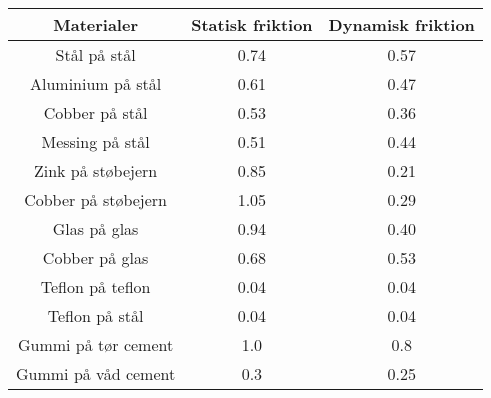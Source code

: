 \begin{tabular}{|c|c|c|}
	\hline
	Materialer&Statisk friktion&Dynamisk friktion\\
	\hline
	Stål på stål&0.74&0.57\\
	Aluminium på stål&0.61&0.47\\
	Cobber på stål&0.53&0.36\\
	Messing på stål&0.51&0.44\\
	Zink på støbejern&0.85&0.21\\
	Cobber på støbejern&1.05&0.29\\
	Glas på glas&0.94&0.40\\
	Cobber på glas&0.68&0.53\\
	Teflon på teflon&0.04&0.04\\
	Teflon på stål&0.04&0.04\\
	Gummi på tør cement&1.0&0.8\\
	Gummi på våd cement&0.3&0.25\\
	\hline
\end{tabular}